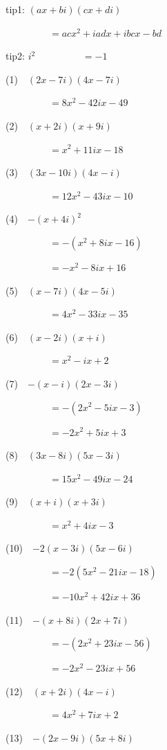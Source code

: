 \documentclass[a4j,twocolumn,10pt,fleqn]{jarticle}
\begin{document}
tip1: $\left(a x + b i\right) \left(c x + d i\right)$

~~~~~~~~~$=a c x^{2} + i a d x + i b c x - b d$


tip2: $i^{2}$
~~~~~~~~~$=-1$


(1)~~$\left(2 x - 7 i\right) \left(4 x - 7 i\right)$

~~~~~~~~~$=8 x^{2} - 42 i x - 49$

(2)~~$\left(x + 2 i\right) \left(x + 9 i\right)$

~~~~~~~~~$=x^{2} + 11 i x - 18$

(3)~~$\left(3 x - 10 i\right) \left(4 x - i\right)$

~~~~~~~~~$=12 x^{2} - 43 i x - 10$

(4)~~$-\left(x + 4 i\right)^{2}$

~~~~~~~~~$=-(x^{2} + 8 i x - 16)$

~~~~~~~~~$=- x^{2} - 8 i x + 16$

(5)~~$\left(x - 7 i\right) \left(4 x - 5 i\right)$

~~~~~~~~~$=4 x^{2} - 33 i x - 35$

(6)~~$\left(x - 2 i\right) \left(x + i\right)$

~~~~~~~~~$=x^{2} - i x + 2$

(7)~~$-\left(x - i\right) \left(2 x - 3 i\right)$

~~~~~~~~~$=-(2 x^{2} - 5 i x - 3)$

~~~~~~~~~$=- 2 x^{2} + 5 i x + 3$

(8)~~$\left(3 x - 8 i\right) \left(5 x - 3 i\right)$

~~~~~~~~~$=15 x^{2} - 49 i x - 24$

(9)~~$\left(x + i\right) \left(x + 3 i\right)$

~~~~~~~~~$=x^{2} + 4 i x - 3$

(10)~~$-2\left(x - 3 i\right) \left(5 x - 6 i\right)$

~~~~~~~~~$=-2(5 x^{2} - 21 i x - 18)$

~~~~~~~~~$=- 10 x^{2} + 42 i x + 36$

(11)~~$-\left(x + 8 i\right) \left(2 x + 7 i\right)$

~~~~~~~~~$=-(2 x^{2} + 23 i x - 56)$

~~~~~~~~~$=- 2 x^{2} - 23 i x + 56$

(12)~~$\left(x + 2 i\right) \left(4 x - i\right)$

~~~~~~~~~$=4 x^{2} + 7 i x + 2$

(13)~~$-\left(2 x - 9 i\right) \left(5 x + 8 i\right)$
\end{document}
